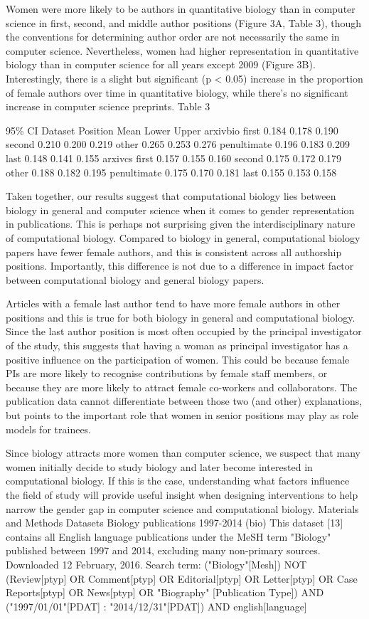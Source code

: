 \documentclass[11pt]{article}
\begin{document}
Women were more likely to be authors in quantitative biology than in computer science in first, second, and middle author positions (Figure 3A, Table 3), though the conventions for determining author order are not necessarily the same in computer science. Nevertheless, women had higher representation in quantitative biology than in computer science for all years except 2009 (Figure 3B). Interestingly, there is a slight but significant (p < 0.05) increase in the proportion of female authors over time in quantitative biology, while there’s no significant increase in computer science preprints.
Table 3




95\% CI
Dataset
Position
Mean
Lower
Upper
arxivbio
first
0.184
0.178
0.190
second
0.210
0.200
0.219
other
0.265
0.253
0.276
penultimate
0.196
0.183
0.209
last
0.148
0.141
0.155
arxivcs
first
0.157
0.155
0.160
second
0.175
0.172
0.179
other
0.188
0.182
0.195
penultimate
0.175
0.170
0.181
last
0.155
0.153
0.158

Taken together, our results suggest that computational biology lies between biology in general and computer science when it comes to gender representation in publications. This is perhaps not surprising given the interdisciplinary nature of computational biology. Compared to biology in general, computational biology papers have fewer female authors, and this is consistent across all authorship positions. Importantly, this difference is not due to a difference in impact factor between computational biology and general biology papers.

Articles with a female last author tend to have more female authors in other positions and this is true for both biology in general and computational biology.  Since the last author position is most often occupied by the principal investigator of the study, this suggests that having a woman as principal investigator has a positive influence on the participation of women. This could be because female PIs are more likely to recognise contributions by female staff members, or because they are more likely to attract female co-workers and collaborators. The publication data cannot differentiate between those two (and other) explanations, but points to the important role that women in senior positions may play as role models for trainees.

Since biology attracts more women than computer science, we suspect that many women initially decide to study biology and later become interested in computational biology. If this is the case, understanding what factors influence the field of study will provide useful insight when designing interventions to help narrow the gender gap in computer science and computational biology.
Materials and Methods
Datasets
Biology publications 1997-2014 (bio)
This dataset [13] contains all English language publications under the MeSH term "Biology" published between 1997 and 2014, excluding many non-primary sources. Downloaded 12 February, 2016. Search term: ("Biology"[Mesh]) NOT (Review[ptyp] OR Comment[ptyp] OR Editorial[ptyp] OR Letter[ptyp] OR Case Reports[ptyp] OR News[ptyp] OR "Biography" [Publication Type]) AND ("1997/01/01"[PDAT] : "2014/12/31"[PDAT]) AND english[language]
\end{document}
